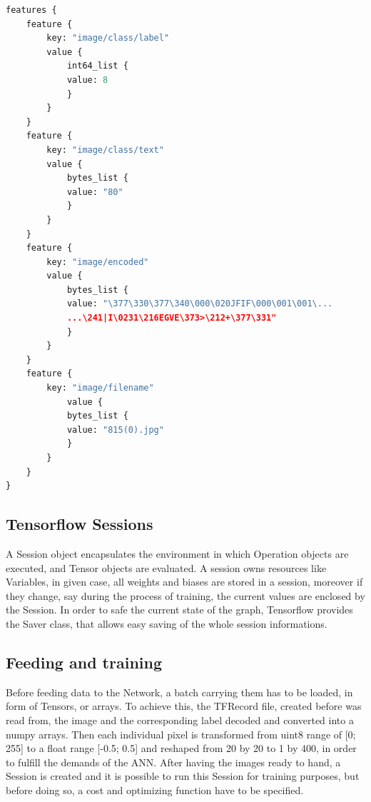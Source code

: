 \begin{minipage}{\linewidth}
\begin{lstlisting}[language=python, caption={Minimized Excerpt of a  TFRecord file}, label={lst:tfrecord},captionpos=b]
features {
	feature {
		key: "image/class/label"
		value {
			int64_list {
			value: 8
			}
		}
	}
	feature {
		key: "image/class/text"
		value {
			bytes_list {
			value: "80"
			}
		}
	}
	feature {
		key: "image/encoded"
		value {
			bytes_list {
			value: "\377\330\377\340\000\020JFIF\000\001\001\...
			...\241|I\0231\216EGVE\373>\212+\377\331"
			}
		}
	}
	feature {
		key: "image/filename"
			value {
			bytes_list {
			value: "815(0).jpg"
			}
		}
	}
}

\end{lstlisting}
\end{minipage}

\subsection{Tensorflow Sessions}
A Session object encapsulates the environment in which Operation objects are executed, and Tensor objects are evaluated\cite{tensorflowsession}. A session owns resources like Variables, in given case, all weights and biases are stored in a session, moreover if they change, say during the process of training, the current values are enclosed by the Session. In order to safe the current state of the graph, Tensorflow provides the Saver class, that allows easy saving of the whole session informations. 

\subsection{Feeding and training}
Before feeding data to the Network, a batch carrying them has to be loaded, in form of Tensors, or arrays. To achieve this, the TFRecord file, created before was read from, the image and the corresponding label decoded and converted into a numpy arrays. Then each individual pixel is transformed from uint8 range of [0; 255] to a float range [-0.5; 0.5] and reshaped from 20 by 20 to 1 by 400, in order to fulfill the demands of the ANN. After having the images ready to hand, a Session is created and it is possible to run this Session for training purposes, but before doing so, a cost and optimizing function have to be specified. 


